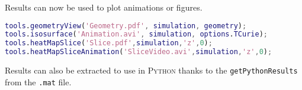 Results can now be used to plot animations or figures. 

\begin{lstlisting}[language=Matlab]
tools.geometryView('Geometry.pdf', simulation, geometry);
tools.isosurface('Animation.avi', simulation, options.TCurie);
tools.heatMapSlice('Slice.pdf',simulation,'z',0);
tools.heatMapSliceAnimation('SliceVideo.avi',simulation,'z',0);
\end{lstlisting}

\medskip
Results can also be extracted to use in \textsc{Python} thanks to the {\tt getPythonResults} from the {\tt .mat} file.